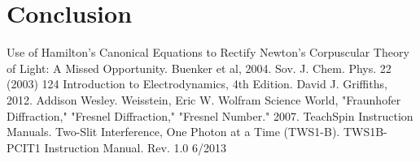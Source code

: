 \documentclass[prb,preprint]{revtex4-1}
\begin{document}
\section{Conclusion}

 
\begin{thebibliography}{3}
 Use of Hamilton's Canonical Equations to Rectify Newton's Corpuscular Theory of Light:  A Missed Opportunity.  Buenker et al, 2004.  Sov. J. Chem. Phys. 22 (2003) 124
 Introduction to Electrodynamics, 4th Edition.  David J. Griffiths, 2012.  Addison Wesley.
Weisstein, Eric W. Wolfram Science World, "Fraunhofer Diffraction," "Fresnel Diffraction," "Fresnel Number." 2007. 
 TeachSpin Instruction Manuals.  Two-Slit Interference, One Photon at a Time (TWS1-B).  TWS1B-PCIT1 Instruction Manual. Rev. 1.0 6/2013

\end{thebibliography}
\end{document}
